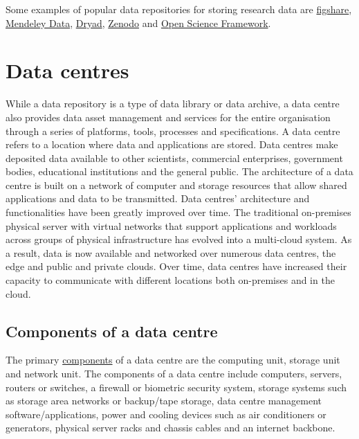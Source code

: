 \documentclass[
]{book}
\begin{document}
Some examples of popular data repositories for storing research data are \href{https://figshare.com/}{figshare}, \href{https://data.mendeley.com/}{Mendeley Data}, \href{https://datadryad.org/stash}{Dryad}, \href{https://datadryad.org/stash}{Zenodo} and \href{https://osf.io/}{Open Science Framework}.

\hypertarget{data-centres}{%
\section{Data centres}\label{data-centres}}

While a data repository is a type of data library or data archive, a data centre also provides data asset management and services for the entire organisation through a series of platforms, tools, processes and specifications. A data centre refers to a location where data and applications are stored. Data centres make deposited data available to other scientists, commercial enterprises, government bodies, educational institutions and the general public. The architecture of a data centre is built on a network of computer and storage resources that allow shared applications and data to be transmitted. Data centres' architecture and functionalities have been greatly improved over time. The traditional on-premises physical server with virtual networks that support applications and workloads across groups of physical infrastructure has evolved into a multi-cloud system. As a result, data is now available and networked over numerous data centres, the edge and public and private clouds. Over time, data centres have increased their capacity to communicate with different locations both on-premises and in the cloud.

\hypertarget{components-of-a-data-centre}{%
\subsection*{Components of a data centre}\label{components-of-a-data-centre}}

The primary \href{https://centriq.com/blog/3-principles-of-data-center-infrastructure-design/}{components} of a data centre are the computing unit, storage unit and network unit. The components of a data centre include computers, servers, routers or switches, a firewall or biometric security system, storage systems such as storage area networks or backup/tape storage, data centre management software/applications, power and cooling devices such as air conditioners or generators, physical server racks and chassis cables and an internet backbone.
\end{document}
